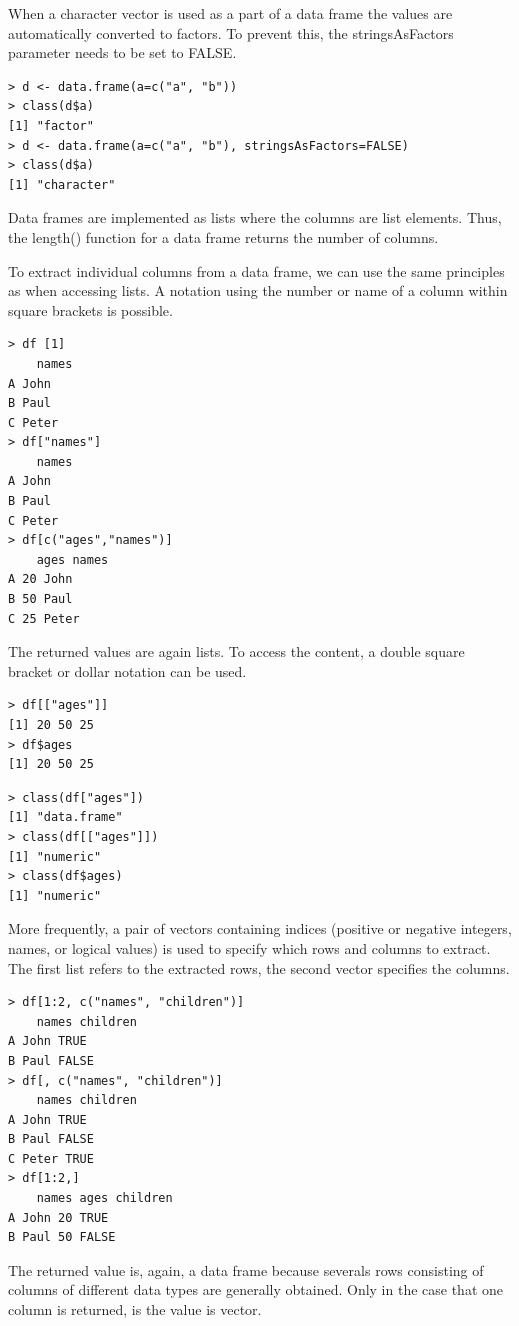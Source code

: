 \documentclass[10pt]{book}
\begin{document}
When a character vector is used as a part of a data frame the values are automatically converted to factors. To prevent this, the stringsAsFactors parameter needs to be set to FALSE.

\begin{verbatim}
> d <- data.frame(a=c("a", "b"))
> class(d$a)
[1] "factor"
> d <- data.frame(a=c("a", "b"), stringsAsFactors=FALSE)
> class(d$a)
[1] "character"
\end{verbatim}

Data frames are implemented as lists where the columns are list elements. Thus, the length() function for a data frame returns the number of columns.

To extract individual columns from a data frame, we can use the same principles as when accessing lists. A notation using the number or name of a column within square brackets is possible.

\begin{verbatim}
> df [1]
    names
A John
B Paul
C Peter
> df["names"]
    names
A John
B Paul
C Peter
> df[c("ages","names")]
    ages names
A 20 John
B 50 Paul
C 25 Peter
\end{verbatim}

The returned values are again lists. To access the content, a double square bracket or dollar notation can be used.

\begin{verbatim}
> df[["ages"]]
[1] 20 50 25
> df$ages
[1] 20 50 25
\end{verbatim}

\begin{verbatim}
> class(df["ages"])
[1] "data.frame"
> class(df[["ages"]])
[1] "numeric"
> class(df$ages)
[1] "numeric"
\end{verbatim}

More frequently, a pair of vectors containing indices (positive or negative integers, names, or logical values) is used to specify which rows and columns to extract. The first list refers to the extracted rows, the second vector specifies the columns.

\begin{verbatim}
> df[1:2, c("names", "children")]
    names children
A John TRUE
B Paul FALSE
> df[, c("names", "children")]
    names children
A John TRUE
B Paul FALSE
C Peter TRUE
> df[1:2,]
    names ages children
A John 20 TRUE
B Paul 50 FALSE
\end{verbatim}

The returned value is, again, a data frame because severals rows consisting of columns of different data types are generally obtained. Only in the case that one column is returned, is the value is vector.
\end{document}
